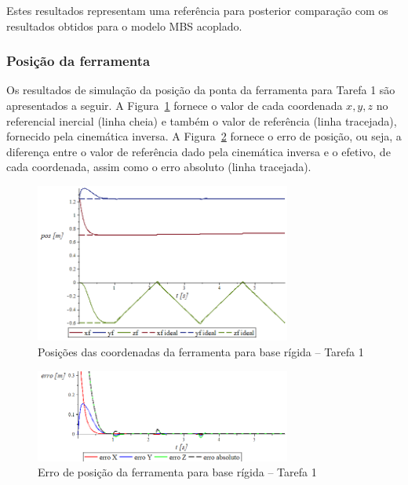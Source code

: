 Estes resultados representam uma referência para posterior comparação com os
resultados obtidos para o modelo MBS acoplado.

\subsubsection{Posição da ferramenta}

Os resultados de simulação da posição da ponta da ferramenta para Tarefa 1 são
apresentados a seguir. A Figura~\ref{fig::t1_posf_base_rig} fornece o valor de
cada coordenada $x, y, z$ no referencial inercial (linha cheia) e também o valor
de referência (linha tracejada), fornecido pela cinemática inversa. A
Figura~\ref{fig::t1_erroposf_base_rig} fornece o erro de posição, ou seja, a
diferença entre o valor de referência dado pela cinemática inversa e o efetivo,
de cada coordenada, assim como o erro absoluto (linha tracejada).

\begin{figure}[h!]
	\centering 
 	\includegraphics[width=0.75\textwidth]{figs/t1_posf_base_rig}
 	\caption{Posições das coordenadas da ferramenta para base rígida -- Tarefa 1}
 	\label{fig::t1_posf_base_rig}
\end{figure}

\begin{figure}[h!]
	\centering 
 	\includegraphics[width=0.75\textwidth]{figs/t1_erroposf_base_rig}
 	\caption{Erro de posição da ferramenta para base rígida -- Tarefa 1}
 	\label{fig::t1_erroposf_base_rig}
\end{figure}


